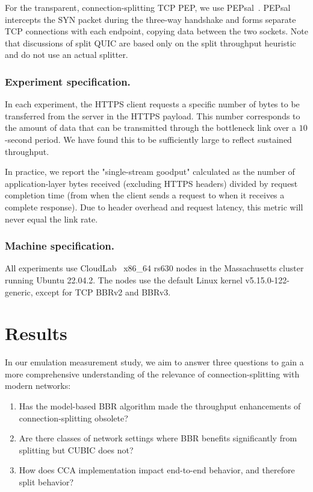For the transparent, connection-splitting TCP PEP, we use PEPsal~\cite
{caini2006pepsal}. PEPsal intercepts the SYN packet during the three-way
handshake and forms separate TCP connections with each endpoint,
copying data between the two sockets. Note that
discussions of split QUIC are based only on the split throughput heuristic
and do not use an actual splitter.

\subsubsection{Experiment specification.}
In each experiment, the HTTPS client requests a specific number of bytes to be
transferred from the server in the HTTPS payload. This number corresponds to the
amount of data that can be transmitted through the bottleneck link over a
$10$-second period. We have found this to be sufficiently large to reflect
sustained throughput.

In practice, we report the "single-stream goodput" calculated as the number of
application-layer bytes received (excluding HTTPS headers) divided by request
completion time (from when the client sends a request to when it receives a
complete response). Due to header overhead and request latency, this metric
will never equal the link rate.

\subsubsection{Machine specification.} All experiments use CloudLab~\cite
 {duplyakin2019design} x86\_64 rs630 nodes in the Massachusetts cluster running
 Ubuntu 22.04.2. The nodes use the default Linux kernel v5.15.0-122-generic,
 except for TCP BBRv2 and BBRv3.%

\section{Results}
\label{sec:splitting:results}



In our emulation measurement study, we aim to answer three questions to gain a
more comprehensive understanding of the relevance of connection-splitting with
modern networks:

\begin{enumerate}[noitemsep]
    \item Has the model-based BBR algorithm made the throughput enhancements of
     connection-splitting obsolete?
    \item Are there classes of network settings where BBR benefits significantly
     from splitting but CUBIC does not?
    \item How does CCA implementation impact end-to-end behavior, and therefore split
     behavior?
\end{enumerate}

